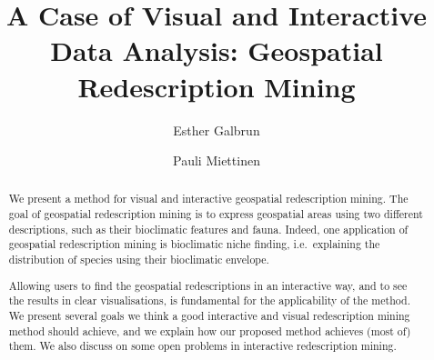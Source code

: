\documentclass{llncs}
\begin{document}
\title{A Case of Visual and Interactive Data Analysis: Geospatial Redescription Mining}

\author{
Esther Galbrun
\and
Pauli Miettinen
}

 
\maketitle
\begin{abstract}
  We present a method for visual and interactive geospatial
  redescription mining. The goal of geospatial redescription mining is
  to express geospatial areas using two different descriptions, such
  as their bioclimatic features and fauna. Indeed, one application of
  geospatial redescription mining is bioclimatic niche finding, i.e.\
  explaining the distribution of species using their bioclimatic
  envelope. 

  Allowing users to find the geospatial redescriptions in an
  interactive way, and to see the results in clear visualisations, is
  fundamental for the applicability of the method. We present several
  goals we think a good interactive and visual redescription mining
  method should achieve, and we explain how our proposed method
  achieves (most of) them. We also discuss on some open problems in
  interactive redescription mining.



\end{abstract}







%

  
\end{document}
